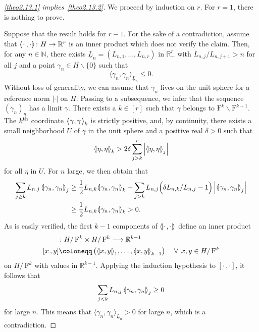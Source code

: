 \documentclass[AHL,Unicode,longabstracts]{cedram}
\newcommand{\innone}[2]{{\langle#2\rangle_{#1}}}
\newcommand{\llangle}{\mathopen{\langle\mkern -3.1mu\lvert}}
\newcommand{\rrangle}{\mathclose{\rvert\mkern -3.1mu\rangle}}
\newcommand{\highinn}[2]{{\llangle#2\rrangle_{#1}}}
\newcommand{\refnorm}[1]{\lvert#1\rvert}
\newcommand{\abss}[1]{\left\lvert #1\right\rvert}
\newcommand{\rquot}[2]{#1/\,#2}
\newcommand{\filter}{\mathrm{F}}
\newcommand{\R}{\mathbb{R}}
\newcommand{\N}{\mathbb{N}}
\renewcommand{\setminus}{\smallsetminus}
\renewcommand*{\to}{\mathchoice{\longrightarrow}{\rightarrow}{\rightarrow}{\rightarrow}}
\let\oldforall\forall
\renewcommand*{\forall}{\mathrel{\oldforall}}
\begin{document}
\begin{proofc}
\begin{proof}[{\eqref{theo2.13.1} implies~\eqref{theo2.13.2}}]
We proceed by induction on $r$. For $r=1$, there is nothing to prove.

Suppose that the result holds for $r-1$. For the sake of a contradiction, assume that $\highinn{}{\cdot\,, \cdot} \colon H \to \R^r$ is an inner product which does not verify the claim. Then, for any $n \in \N$, there exists $\underline{L}_n=(L_{n,1}, \dots, L_{n,r})$ in $\R_+^r$ with $L_{n,j}/L_{n, j+1} > n$ for all $j$ and a point $\gamma_n\in H \setminus \{0\}$ such that
\[
\innone{\underline L_n}{\gamma_n, \gamma_n}\le0.
\]
Without loss of generality, we can assume that $\gamma_n$ lives on the unit sphere for a reference norm $\refnorm{\cdot}$ on $H$. Passing to a subsequence, we infer that the sequence $(\gamma_n)_n$ has a limit $\gamma$. There exists a $k \in [r]$ such that $\gamma$ belongs to $\filter^k \setminus \filter^{k+1}$. The $k^{\rm th}$ coordinate $\highinn{k}{\gamma, \gamma}$ is strictly positive, and, by continuity, there exists a small neighborhood $U$ of $\gamma$ in the unit sphere and a positive real $\delta>0$ such that
\[
\highinn{k}{\eta, \eta} > 2 \delta \sum_{j>k}^r \abss{\highinn{j}{\eta, \eta}}
\]
for all $\eta$ in $U$. For $n$ large, we then obtain that
\begin{align*}
\sum_{j \ge k} L_{n,j} \, \highinn{j}{\gamma_n, \gamma_n} &\ge \frac 12 L_{n,k} \highinn{k}{\gamma_n, \gamma_n} + \sum_{j > k} L_{n,j} \Big(\delta { L_{n,k}}/{ L_{n,j}} - 1\Big) \left|\highinn{j}{\gamma_n, \gamma_n}\right| \\
&\ge \frac 12 L_{n,k} \highinn{k}{\gamma_n, \gamma_n} > 0.
\end{align*}
As is easily verified, the first $k-1$ components of $\highinn{}{\cdot \,, \cdot}$ define an inner product
\begin{align*}
[\cdot \,, \cdot]&\colon \rquot{H}{\filter^k}\times \rquot{H}{\filter^k} \to \R^{k-1}\\
[x \,, y] &\coloneqq \left(\highinn{1}{x, y}, \dots, \highinn{k-1}{x, y}\right) \quad \forall\, x, y \in\rquot{H}{\filter^k}
\end{align*}
on $\rquot{H}{\filter^k}$ with values in $\R^{k-1}$. Applying the induction hypothesis to $[\cdot \,, \cdot]$, it follows that
\[
\sum_{j < k} L_{n,j} \, \highinn{j}{\gamma_n, \gamma_n} \ge 0
\]
for large $n$. This means that $\innone{\underline L_n}{\gamma_n, \gamma_n}>0$ for large $n$, which is a contradiction.\let\qed\relax
\end{proof}



\end{proofc}
\end{document}
